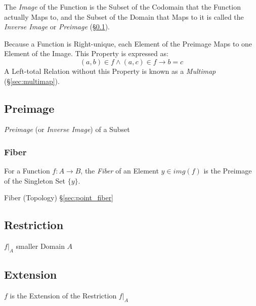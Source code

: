 The \emph{Image} of the Function is the Subset of the Codomain that
the Function actually Maps to, and the Subset of the Domain that Maps
to it is called the \emph{Inverse Image} or \emph{Preimage}
(\S\ref{sec:preimage}).

Because a Function is Right-unique, each Element of the Preimage Maps
to one Element of the Image. This Property is expressed as:
\[
  (a,b) \in f \wedge (a,c) \in f \rightarrow b = c
\]
A Left-total Relation without this Property is known as a
\emph{Multimap} (\S\ref{sec:multimap}).



\subsection{Preimage}\label{sec:preimage}

\emph{Preimage} (or \emph{Inverse Image}) of a Subset



\subsubsection{Fiber}\label{sec:fiber}

For a Function $f : A \rightarrow B$, the \emph{Fiber} of an Element
$y \in img(f)$ is the Preimage of the Singleton Set $\{y\}$.

Fiber (Topology) \S\ref{sec:point_fiber}



\subsection{Restriction}\label{sec:function_restriction}

$f|_A$ smaller Domain $A$



\subsection{Extension}\label{sec:function_extension}

$f$ is the Extension of the Restriction $f|_A$



